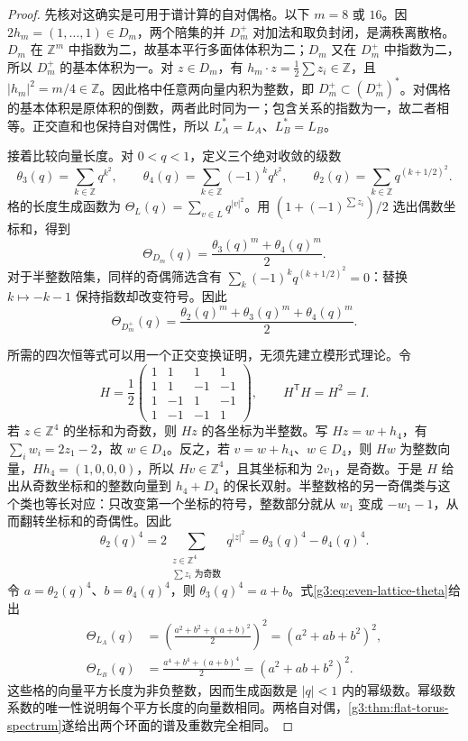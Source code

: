 \begin{proof}
	先核对这确实是可用于谱计算的自对偶格。以下 \(m=8\) 或 \(16\)。因 \(2h_m=(1,\ldots,1)\in D_m\)，两个陪集的并 \(D_m^+\) 对加法和取负封闭，是满秩离散格。\(D_m\) 在 \(\mathbb Z^m\) 中指数为二，故基本平行多面体体积为二；\(D_m\) 又在 \(D_m^+\) 中指数为二，所以 \(D_m^+\) 的基本体积为一。对 \(z\in D_m\)，有 \(h_m\cdot z=\frac12\sum z_i\in\mathbb Z\)，且 \(|h_m|^2=m/4\in\mathbb Z\)。因此格中任意两向量内积为整数，即 \(D_m^+\subset(D_m^+)^*\)。对偶格的基本体积是原体积的倒数，两者此时同为一；包含关系的指数为一，故二者相等。正交直和也保持自对偶性，所以 \(L_A^*=L_A\)、\(L_B^*=L_B\)。

	接着比较向量长度。对 \(0<q<1\)，定义三个绝对收敛的级数
	\[
		\theta_3(q)=\sum_{k\in\mathbb Z}q^{k^2},\qquad
		\theta_4(q)=\sum_{k\in\mathbb Z}(-1)^kq^{k^2},\qquad
		\theta_2(q)=\sum_{k\in\mathbb Z}q^{(k+1/2)^2}.
	\]
	格的长度生成函数为 \(\Theta_L(q)=\sum_{v\in L}q^{|v|^2}\)。用 \((1+(-1)^{\sum z_i})/2\) 选出偶数坐标和，得到
	\[
		\Theta_{D_m}(q)=\frac{\theta_3(q)^m+\theta_4(q)^m}{2}.
	\]
	对于半整数陪集，同样的奇偶筛选含有
	\(\sum_k(-1)^kq^{(k+1/2)^2}=0\)：替换 \(k\mapsto-k-1\) 保持指数却改变符号。因此
	\begin{equation}\label{g3:eq:even-lattice-theta}
		\Theta_{D_m^+}(q)
		=\frac{\theta_2(q)^m+\theta_3(q)^m+\theta_4(q)^m}{2}.
	\end{equation}

	所需的四次恒等式可以用一个正交变换证明，无须先建立模形式理论。令
	\[
		H=\frac12
		\begin{pmatrix}
			1&1&1&1\\
			1&1&-1&-1\\
			1&-1&1&-1\\
			1&-1&-1&1
		\end{pmatrix},\qquad H^{\mathsf T}H=H^2=I.
	\]
	若 \(z\in\mathbb Z^4\) 的坐标和为奇数，则 \(Hz\) 的各坐标为半整数。写 \(Hz=w+h_4\)，有
	\(\sum_iw_i=2z_1-2\)，故 \(w\in D_4\)。反之，若 \(v=w+h_4\)、\(w\in D_4\)，则 \(Hw\) 为整数向量，\(Hh_4=(1,0,0,0)\)，所以 \(Hv\in\mathbb Z^4\)，且其坐标和为 \(2v_1\)，是奇数。于是 \(H\) 给出从奇数坐标和的整数向量到 \(h_4+D_4\) 的保长双射。半整数格的另一奇偶类与这个类也等长对应：只改变第一个坐标的符号，整数部分就从 \(w_1\) 变成 \(-w_1-1\)，从而翻转坐标和的奇偶性。因此
	\[
		\theta_2(q)^4
		=2\sum_{\substack{z\in\mathbb Z^4\\\sum z_i\text{ 为奇数}}}q^{|z|^2}
		=\theta_3(q)^4-\theta_4(q)^4.
	\]
	令 \(a=\theta_2(q)^4\)、\(b=\theta_4(q)^4\)，则 \(\theta_3(q)^4=a+b\)。式\eqref{g3:eq:even-lattice-theta}给出
	\[
		\begin{split}
		\Theta_{L_A}(q)
		&=\left(\frac{a^2+b^2+(a+b)^2}{2}\right)^2
		 =(a^2+ab+b^2)^2,\\
		\Theta_{L_B}(q)
		&=\frac{a^4+b^4+(a+b)^4}{2}
		 =(a^2+ab+b^2)^2.
		\end{split}
	\]
	这些格的向量平方长度为非负整数，因而生成函数是 \(|q|<1\) 内的幂级数。幂级数系数的唯一性说明每个平方长度的向量数相同。两格自对偶，\cref{g3:thm:flat-torus-spectrum}遂给出两个环面的谱及重数完全相同。


\end{proof}
